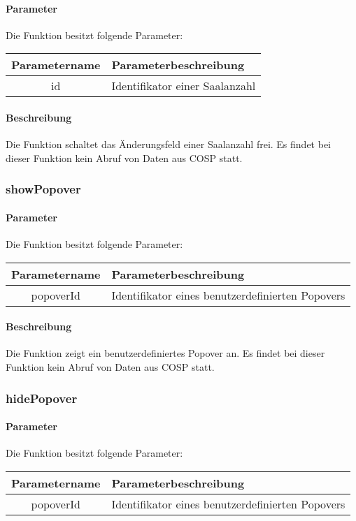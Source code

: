 \paragraph{Parameter} Die Funktion besitzt folgende Parameter:
\begin{table}[H]
	\begin{tabular}{|c|p{11cm}|}
		\hline
		\textbf{Parametername} & \textbf{Parameterbeschreibung} \\ \hline
		id & Identifikator einer Saalanzahl \\ \hline
	\end{tabular}
\end{table}
\paragraph{Beschreibung} Die Funktion schaltet das Änderungsfeld einer Saalanzahl frei. Es findet bei dieser Funktion kein Abruf von Daten aus {\glqq COSP\grqq} statt.
\subsubsection{showPopover}
\paragraph{Parameter} Die Funktion besitzt folgende Parameter:
\begin{table}[H]
	\begin{tabular}{|c|p{11cm}|}
		\hline
		\textbf{Parametername} & \textbf{Parameterbeschreibung} \\ \hline
		popoverId & Identifikator eines benutzerdefinierten Popovers \\ \hline
	\end{tabular}
\end{table}
\paragraph{Beschreibung} Die Funktion zeigt ein benutzerdefiniertes Popover an. Es findet bei dieser Funktion kein Abruf von Daten aus {\glqq COSP\grqq} statt.
\subsubsection{hidePopover}
\paragraph{Parameter} Die Funktion besitzt folgende Parameter:
\begin{table}[H]
	\begin{tabular}{|c|p{11cm}|}
		\hline
		\textbf{Parametername} & \textbf{Parameterbeschreibung} \\ \hline
		popoverId & Identifikator eines benutzerdefinierten Popovers \\ \hline
	\end{tabular}
\end{table}
